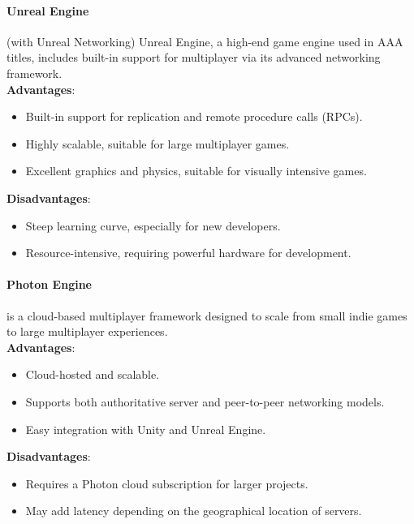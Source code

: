 \documentclass{article} %
\begin{document}
\paragraph{Unreal Engine} (with Unreal Networking) Unreal Engine,
a high-end game engine used in AAA titles, includes built-in support for multiplayer via its advanced networking framework.
\\
\textbf{Advantages}:
\begin{itemize}
	\item Built-in support for replication and remote procedure calls (RPCs).
	\item Highly scalable, suitable for large multiplayer games.
	\item Excellent graphics and physics, suitable for visually intensive games.
\end{itemize}
\textbf{Disadvantages}:
\begin{itemize}
	\item Steep learning curve, especially for new developers.
	\item Resource-intensive, requiring powerful hardware for development.
\end{itemize}

\paragraph{Photon Engine} is a cloud-based multiplayer framework designed to scale from small indie games to large multiplayer experiences.
\\
\textbf{Advantages}:
\begin{itemize}
	\item Cloud-hosted and scalable.
	\item Supports both authoritative server and peer-to-peer networking models.
	\item Easy integration with Unity and Unreal Engine.
\end{itemize}
\textbf{Disadvantages}:
\begin{itemize}
	\item Requires a Photon cloud subscription for larger projects.
	\item May add latency depending on the geographical location of servers.
\end{itemize}
\end{document}
